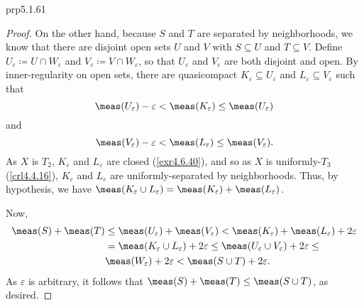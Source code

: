 \begin{prp}{}{prp5.1.61}
\begin{proof}
On the other hand, because $S$ and $T$ are separated by neighborhoods, we know that there are disjoint open sets $U$ and $V$ with $S\subseteq U$ and $T\subseteq V$.  Define $U_\varepsilon \coloneqq U\cap W_{\varepsilon}$ and $V_\varepsilon \coloneqq V\cap W_{\varepsilon}$, so that $U_{\varepsilon}$ and $V_{\varepsilon}$ are both disjoint and open.  By inner-regularity on open sets, there are quasicompact $K_{\varepsilon}\subseteq U_{\varepsilon}$ and $L_{\varepsilon}\subseteq V_{\varepsilon}$ such that
\begin{equation}
\meas (U_{\varepsilon})-\varepsilon <\meas (K_{\varepsilon})\leq \meas (U_{\varepsilon})
\end{equation}
and
\begin{equation}
\meas (V_{\varepsilon})-\varepsilon <\meas (L_{\varepsilon})\leq \meas (V_{\varepsilon}).
\end{equation}
As $X$ is $T_2$, $K_{\varepsilon}$ and $L_{\varepsilon}$ are closed (\cref{exr4.6.40}), and so as $X$ is uniformly-$T_3$ (\cref{crl4.4.16}), $K_{\varepsilon}$ and $L_{\varepsilon}$ are uniformly-separated by neighborhoods.   Thus, by hypothesis, we have $\meas (K_{\varepsilon}\cup L_{\varepsilon})=\meas (K_{\varepsilon})+\meas (L_{\varepsilon})$.

Now,
\begin{equation}
\begin{split}
\meas (S)+\meas (T) & \leq \meas (U_{\varepsilon})+\meas (V_{\varepsilon})<\meas (K_{\varepsilon})+\meas (L_{\varepsilon})+2\varepsilon \\
& =\meas (K_{\varepsilon}\cup L_{\varepsilon})+2\varepsilon \leq \meas (U_{\varepsilon}\cup V_{\varepsilon})+2\varepsilon \leq \\
& \meas (W_{\varepsilon})+2\varepsilon <\meas (S\cup T)+2\varepsilon .
\end{split}
\end{equation}
As $\varepsilon$ is arbitrary, it follows that $\meas (S)+\meas (T)\leq \meas (S\cup T)$, as desired.
\end{proof}
\end{prp}
